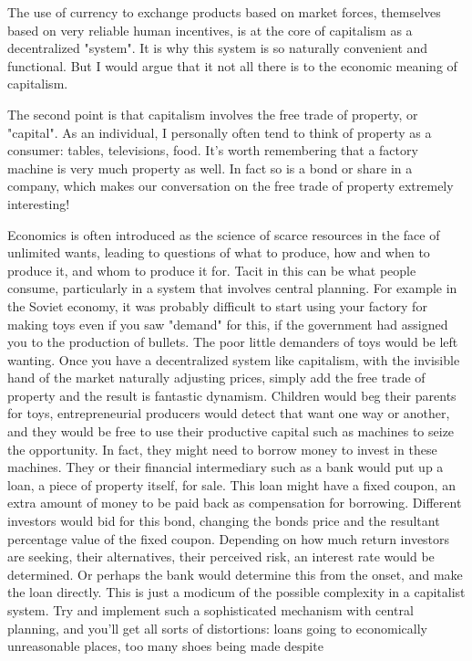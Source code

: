 \documentclass[12pt]{memoir}
\begin{document}
			The use of currency to exchange products based on market forces, themselves based on very reliable human incentives, is at the core of capitalism as a decentralized "system". It is why this system 
			is so naturally convenient and functional. But I would argue that it not all there is to the economic meaning of capitalism.\
			
			The second point is that capitalism involves the free trade of property, or "capital". As an individual, I personally often tend to think of property as a consumer: 
			tables, televisions, food. It's worth remembering that a factory machine is very much property as well. In fact so is a bond or share in a company, which makes our conversation 
			on the free trade of property extremely interesting!\

			Economics is often introduced as the science of scarce resources in the face of unlimited wants, leading to questions of what to produce, how and when to produce it, and whom to produce it for. Tacit in this can 
			be what people consume, particularly in a system that involves central planning. For example in the Soviet economy, it was probably difficult to start using your factory for making toys even if you 
			saw "demand" for this, if the government had assigned you to the production of bullets. The poor little demanders of toys would be left wanting. Once you have a decentralized system like capitalism, with the 
			invisible hand of the market naturally adjusting prices, simply add the free trade of property and the result is fantastic dynamism. Children would beg their parents for toys, entrepreneurial producers would 
			detect that want one way or another, and they would be free to use their productive capital such as machines to seize the opportunity. In fact, they might need to borrow money to invest in these machines. 
			They or their financial intermediary such as a bank would put up a loan, a piece of property itself, for sale. This loan might have a fixed coupon, an extra amount of money to be paid back as compensation for
			borrowing. Different investors would bid for this bond, changing the bonds price and the resultant percentage value of the fixed coupon. Depending on how much return investors are seeking, their alternatives, 
			their perceived risk, an interest rate would be determined. Or perhaps the bank would determine this from the onset, and make the loan directly. This is just a modicum of the possible complexity in a capitalist 
			system. Try and implement such a sophisticated mechanism with central planning, and you'll get all sorts of distortions: loans going to economically unreasonable places, too many shoes being made despite 
\end{document}
